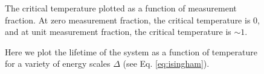 \documentclass[twocolumn,superscriptaddress,aps,prb,floatfix]{revtex4-1}
\begin{document}
\begin{figure}
\begin{center}
\end{center}
\caption{The critical temperature plotted as a function of measurement fraction.  At zero measurement fraction, the critical temperature is 0, and at unit measurement fraction, the critical temperature is $\sim 1$.}
\label{fig:CriticalTempVsMeasurementFraction}
\end{figure}

\begin{figure}
\begin{center}
\end{center}
\caption{Here we plot the lifetime of the system as a function of temperature for a variety of energy scales $\Delta$ (see Eq. \ref{eq:isingham}).}
\label{fig:LifetimeVsTemperatureVsEnergy}
\end{figure}
\end{document}
